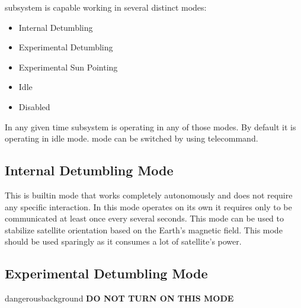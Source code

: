 
\Adcs subsystem is capable working in several distinct modes:

\begin{itemize}
    \item Internal Detumbling
    \item Experimental Detumbling
    \item Experimental Sun Pointing
    \item Idle
    \item Disabled
\end{itemize}

In any given time \Adcs subsystem is operating in any of those modes. By default it
is operating in idle mode. \Adcs mode can be switched by using 
telecommand.

\subsection{Internal Detumbling Mode}

This is \Imtq builtin mode that works completely autonomously and does not 
require any specific interaction. In this mode \Imtq operates on its own 
it requires only to be communicated at least once every several seconds. 
This mode can be used to stabilize satellite orientation based on the 
Earth's magnetic field. This mode should be used sparingly as it consumes 
a lot of satellite's power. 

\subsection{Experimental Detumbling Mode}

\begin{coloriconbox}{\faHandStopO}{dangerousbackground}
    \textbf{DO NOT TURN ON THIS MODE}
\end{coloriconbox}


